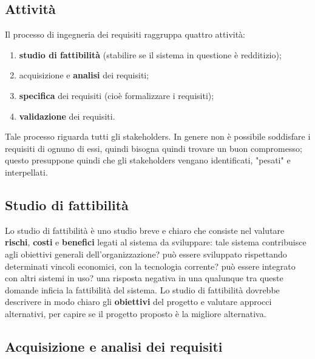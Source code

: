 \documentclass[a4paper]{article}
\begin{document}
		
	\subsection{Attività}

		
Il processo di ingegneria dei requisiti raggruppa quattro attività:
		
	\begin{enumerate}
		
			
	\item \textbf{studio di fattibilità} (stabilire se il sistema in questione è redditizio);
			
	\item acquisizione e \textbf{analisi} dei requisiti;
			
	\item \textbf{specifica} dei requisiti (cioè formalizzare i requisiti);
			
	\item \textbf{validazione} dei requisiti.
		
	\end{enumerate}

		
Tale processo riguarda tutti gli stakeholders. In genere non è possibile soddisfare i requisiti di ognuno di essi, quindi bisogna quindi trovare un buon compromesso; questo presuppone quindi che gli stakeholders vengano identificati, "pesati" e interpellati.

		
	\subsection{Studio di fattibilità}

		
Lo studio di fattibilità è uno studio breve e chiaro che consiste nel valutare \textbf{rischi}, \textbf{costi} e \textbf{benefici} legati al sistema da sviluppare: tale sistema contribuisce agli obiettivi generali dell'organizzazione? può essere sviluppato rispettando determinati vincoli economici, con la tecnologia corrente? può essere integrato con altri sistemi in uso? una risposta negativa in una qualunque tra queste domande inficia la fattibilità del sistema. Lo studio di fattibilità dovrebbe descrivere in modo chiaro gli \textbf{obiettivi} del progetto e valutare approcci alternativi, per capire se il progetto proposto è la migliore alternativa.

		
	\subsection{Acquisizione e analisi dei requisiti}
\end{document}
